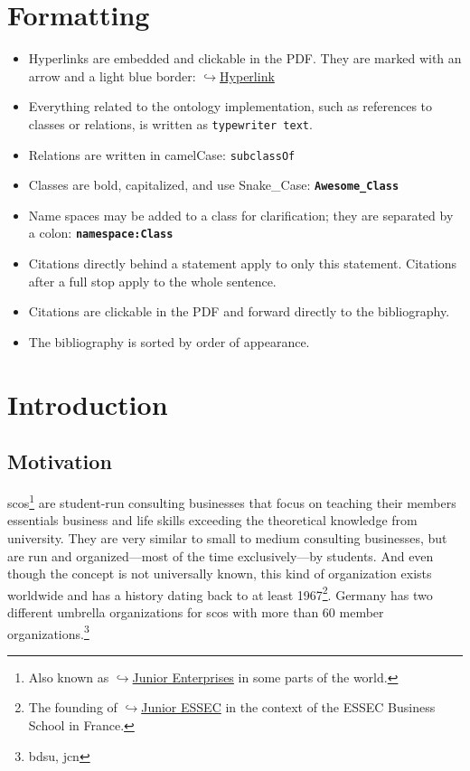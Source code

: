 \documentclass[a4paper, DIV=13, BCOR=0cm]{scrbook}
\newcommand{\class}[1]{\texttt{\textbf{#1}}}
\newcommand{\link}[2]{\href{#1}{$\hookrightarrow$#2}}
\begin{document}
\chapter*{Formatting}
\begin{itemize}
	\item Hyperlinks are embedded and clickable in the PDF. They are marked with an arrow and a light blue border: \link{https://hyperlink.com}{Hyperlink}
	\item Everything related to the ontology implementation, such as references to classes or relations, is written as \texttt{typewriter text}.
	\item Relations are written in camelCase: \texttt{subclassOf}
	\item Classes are bold, capitalized, and use Snake\_Case: \texttt{\textbf{Awesome\_Class}}
	\item Name spaces may be added to a class for clarification; they are separated by a colon: \class{namespace:Class}
	\item Citations directly behind a statement apply to only this statement. Citations after a full stop apply to the whole sentence.
	\item Citations are clickable in the PDF and forward directly to the bibliography.
	\item The bibliography is sorted by order of appearance.
\end{itemize}


\tableofcontents
\newpage

\mainmatter
\chapter{Introduction}
\section{Motivation}
\glspl{sco}\footnote{Also known as 
\link{https://en.wikipedia.org/wiki/Junior_enterprise}{Junior Enterprises} in some parts of the world.} are student-run consulting businesses that focus on teaching their members essentials business and life skills exceeding the theoretical knowledge from university. They are very similar to small to medium consulting businesses, but are run and organized---most of the time exclusively---by students. And even though the concept is not universally known, this kind of organization exists worldwide and has a history dating back to at least 1967\footnote{The founding of \link{https://www.en.junioressec.com/}{Junior ESSEC} in the context of the ESSEC Business School in France.}. Germany has two different umbrella organizations for \glspl{sco} with more than 60 member organizations.\footnote{\gls{bdsu}, \gls{jcn}}
\end{document}
